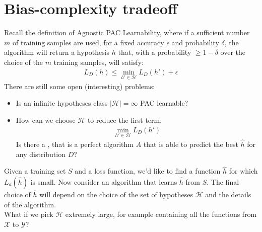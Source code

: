 \documentclass[../template.tex]{subfiles}
\begin{document}
\section{Bias-complexity tradeoff}
Recall the definition of Agnostic PAC Learnability, where if a sufficient number $m$ of training samples are used, for a fixed accuracy $\epsilon$ and probability $\delta$, the algorithm will return a hypothesis $h$ that, with a probability $\geq 1- \delta$ over the choice of the $m$ training samples, will satisfy:
\begin{align*}
    L_D(h) \leq \min_{h' \in \mathcal{H}} L_D(h') + \epsilon
\end{align*}
There are still some open (interesting) problems:
\begin{itemize}
    \item Is an infinite hypotheses class $|\mathcal{H}| = \infty$ PAC learnable? 
    \item How can we choose $\mathcal{H}$ to reduce the first term:
    \begin{align*}
        \min_{h' \in \mathcal{H}} L_D(h')    
    \end{align*}  
    Is there a , that is a perfect algorithm $A$ that is able to predict the best $\hat{h}$ for any distribution $D$? 
\end{itemize}

Given a training set $S$ and a loss function, we'd like to find a function $\hat{h}$ for which $L_d (\hat{h})$ is small. Now consider an algorithm that learns $\hat{h}$ from $S$. The final choice of $\hat{h}$ will depend on the choice of the set of hypotheses $\mathcal{H}$ and the details of the algorithm.\\

What if we pick $\mathcal{H}$ extremely large, for example containing all the functions from $\mathcal{X}$ to $\mathcal{Y}$?\\
\end{document}

